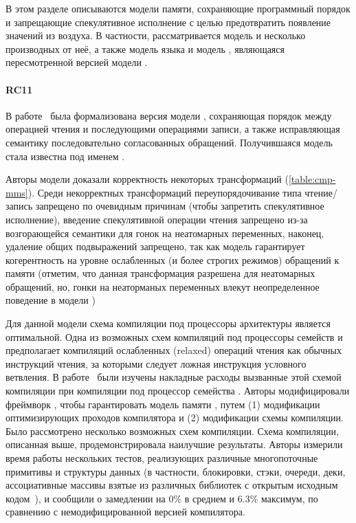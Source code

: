 В этом разделе описываются модели памяти, 
сохраняющие программный порядок и запрещающие 
спекулятивное исполнение с целью 
предотвратить появление значений из воздуха. 
В частности, рассматривается модель \RCMM
и несколько производных от неё, 
а также модель языка \OCaml и модель \JAM, 
являющаяся пересмотренной версией модели \Java.  

\paragraph{RC11}

В работе~\cite{Lahav-al:PLDI17} была формализована
версия модели \CMM, сохраняющая порядок между 
операцией чтения и последующими операциями записи, 
а также исправляющая семантику последовательно согласованных обращений. 
Получившаяся модель стала известна под именем \RCMM. 

Авторы модели доказали корректность некоторых трансформаций 
(\see \cref{table:cmp-mms}).
Среди некорректных трансформаций
переупорядочивание типа чтение/запись запрещено 
по очевидным причинам (чтобы запретить спекулятивное исполнение), 
введение спекулятивной операции чтения запрещено 
из-за возгорающейся семантики для гонок на неатомарных переменных, 
наконец, удаление общих подвыражений запрещено, 
так как модель гарантирует когерентность 
на уровне ослабленных (и более строгих режимов) обращений к памяти
(отметим, что данная трансформация разрешена 
для неатомарных обращений, но, гонки на неаторманых 
переменных влекут неопределенное поведение в модели \RCMM) 

Для данной модели схема компиляции под процессоры архитектуры 
\Intel является оптимальной. Одна из возможных 
схем компиляций под процессоры семейств \ARM и \POWER
предполагает компиляций ослабленных (relaxed) операций чтения
как обычных инструкций чтения, за которыми следует 
ложная инструкция условного ветвления. 
В работе~\cite{Ou-Demsky:OOPSLA18} были изучены 
накладные расходы вызванные этой схемой компиляции
при компиляции под процессор семейства . 
Авторы модифицировали фреймворк \LLVM,
чтобы гарантировать модель памяти \RCMM, 
путем (1) модификации оптимизирующих проходов компилятора
и (2) модификации схемы компиляции. 
Было рассмотрено несколько возможных схем компиляции. 
Схема компиляции, описанная выше, продемонстрировала наилучшие результаты. 
Авторы измерили время работы нескольких тестов, 
реализующих различные многопоточные примитивы и структуры данных
(в частности, блокировки, стэки, очереди, деки, ассоциативные массивы
взятые из различных библиотек с открытым 
исходным кодом~\cite{CDSLib, FollyLib, JunctionLib}), 
и сообщили о замедлении на 0\% в среднем и 6.3\% максимум,
по сравнению с немодифицированной версией компилятора. 

